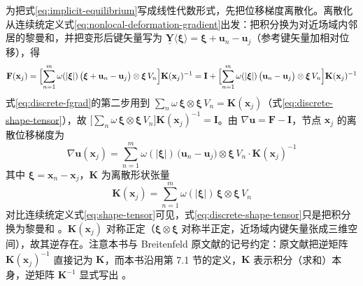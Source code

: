 为把式\eqref{eq:implicit-equilibrium}写成线性代数形式，先把位移梯度离散化。离散化从连续统定义式\eqref{eq:nonlocal-deformation-gradient}出发：把积分换为对近场域内邻居的黎曼和，并把变形后键矢量写为 $\underline{\mathbf{Y}}\langle\boldsymbol{\xi}\rangle=\boldsymbol{\xi}+\mathbf{u}_n-\mathbf{u}_j$（参考键矢量加相对位移），得
\begin{equation}
  \mathbf{F}(\mathbf{x}_j)
  =\Bigl[\sum_{n=1}^{m}\omega(|\boldsymbol{\xi}|)\,
  \bigl(\boldsymbol{\xi}+\mathbf{u}_n-\mathbf{u}_j\bigr)\otimes\boldsymbol{\xi}\,V_n\Bigr]\mathbf{K}(\mathbf{x}_j)^{-1}
  =\mathbf{I}+\Bigl[\sum_{n=1}^{m}\omega(|\boldsymbol{\xi}|)\,
  \bigl(\mathbf{u}_n-\mathbf{u}_j\bigr)\otimes\boldsymbol{\xi}\,V_n\Bigr]\mathbf{K}(\mathbf{x}_j)^{-1}
  \label{eq:discrete-fgrad}
\end{equation}
式\eqref{eq:discrete-fgrad}的第二步用到 $\sum_{n}\omega\,\boldsymbol{\xi}\otimes\boldsymbol{\xi}\,V_n=\mathbf{K}(\mathbf{x}_j)$（式\eqref{eq:discrete-shape-tensor}），故 $\bigl[\sum_{n}\omega\,\boldsymbol{\xi}\otimes\boldsymbol{\xi}\,V_n\bigr]\mathbf{K}(\mathbf{x}_j)^{-1}=\mathbf{I}$。由 $\nabla\mathbf{u}=\mathbf{F}-\mathbf{I}$，节点 $\mathbf{x}_j$ 的离散位移梯度为
\begin{equation}
  \nabla\mathbf{u}(\mathbf{x}_j)
  =\sum_{n=1}^{m}\omega(|\boldsymbol{\xi}|)\,
  \bigl(\mathbf{u}_n-\mathbf{u}_j\bigr)\otimes\boldsymbol{\xi}\,V_n\cdot\mathbf{K}(\mathbf{x}_j)^{-1}
  \label{eq:discrete-grad-u}
\end{equation}
其中 $\boldsymbol{\xi}=\mathbf{x}_n-\mathbf{x}_j$，$\mathbf{K}$ 为离散形状张量
\begin{equation}
  \mathbf{K}(\mathbf{x}_j)=\sum_{n=1}^{m}\omega(|\boldsymbol{\xi}|)\,
  \boldsymbol{\xi}\otimes\boldsymbol{\xi}\,V_n
  \label{eq:discrete-shape-tensor}
\end{equation}
对比连续统定义式\eqref{eq:shape-tensor}可见，式\eqref{eq:discrete-shape-tensor}只是把积分换为黎曼和 \cite{Breitenfeld2014}。$\mathbf{K}(\mathbf{x}_j)$ 对称正定（$\boldsymbol{\xi}\otimes\boldsymbol{\xi}$ 对称半正定，近场域内键矢量张成三维空间），故其逆存在。注意本书与 Breitenfeld 原文献的记号约定：原文献把逆矩阵 $\mathbf{K}(\mathbf{x}_j)^{-1}$ 直接记为 $\mathbf{K}$，而本书沿用第 7.1 节的定义，$\mathbf{K}$ 表示积分（求和）本身，逆矩阵 $\mathbf{K}^{-1}$ 显式写出 \cite{Breitenfeld2014,BreitenfeldThesis2014}。

